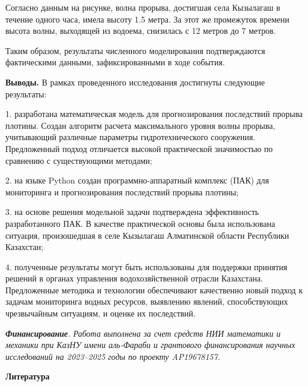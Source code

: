 \begin{multicols}{2}
Согласно данным на рисунке, волна прорыва, достигшая села Кызылагаш в
течение одного часа, имела высоту 1.5 метра. За этот же промежуток
времени высота волны, выходящей из водоема, снизилась с 12 метров до 7
метров.

Таким образом, результаты численного моделирования подтверждаются
фактическими данными, зафиксированными в ходе события.

{\bfseries Выводы.} В рамках проведенного исследования достигнуты следующие
результаты:

1. разработана математическая модель для прогнозирования последствий
прорыва плотины. Создан алгоритм расчета максимального уровня волны
прорыва, учитывающий различные параметры гидротехнического сооружения.
Предложенный подход отличается высокой практической значимостью по
сравнению с существующими методами;

2. на языке Python создан программно-аппаратный комплекс (ПАК) для
мониторинга и прогнозирования последствий прорыва плотины;

3. на основе решения модельной задачи подтверждена эффективность
разработанного ПАК. В качестве практической основы была использована
ситуация, произошедшая в селе Кызылагаш Алматинской области Республики
Казахстан;

4. полученные результаты могут быть использованы для поддержки принятия
решений в органах управления водохозяйственной отрасли Казахстана.
Предложенные методика и технологии обеспечивают качественно новый
подход к задачам мониторинга водных ресурсов, выявлению явлений,
способствующих чрезвычайным ситуациям, и оценке их последствий.

\emph{{\bfseries Финансирование}. Работа выполнена за счет средств НИИ
математики и механики при КазНУ имени аль-Фараби и грантового
финансирования научных исследований на 2023--2025 годы по проекту
AP19678157.}
\end{multicols}

\begin{center}
{\bfseries Литература}
\end{center}

